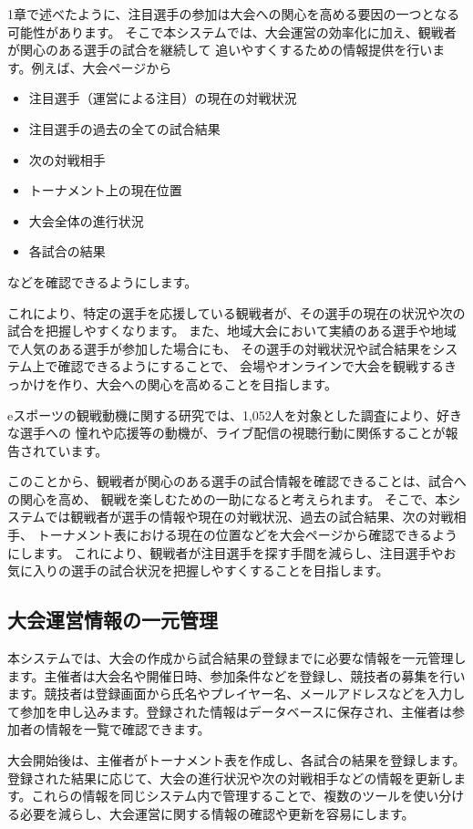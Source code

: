 1章で述べたように、注目選手の参加は大会への関心を高める要因の一つとなる可能性があります。
そこで本システムでは、大会運営の効率化に加え、観戦者が関心のある選手の試合を継続して
追いやすくするための情報提供を行います。例えば、大会ページから

\begin{itemize}
  \item 注目選手（運営による注目）の現在の対戦状況
  \item 注目選手の過去の全ての試合結果
  \item 次の対戦相手
  \item トーナメント上の現在位置
  \item 大会全体の進行状況
  \item 各試合の結果
\end{itemize}
などを確認できるようにします。

これにより、特定の選手を応援している観戦者が、その選手の現在の状況や次の試合を把握しやすくなります。
また、地域大会において実績のある選手や地域で人気のある選手が参加した場合にも、
その選手の対戦状況や試合結果をシステム上で確認できるようにすることで、
会場やオンラインで大会を観戦するきっかけを作り、大会への関心を高めることを目指します。

eスポーツの観戦動機に関する研究では、1,052人を対象とした調査により、好きな選手への
憧れや応援等の動機が、ライブ配信の視聴行動に関係することが報告されています。\cite{scientificreports2024}

このことから、観戦者が関心のある選手の試合情報を確認できることは、試合への関心を高め、
観戦を楽しむための一助になると考えられます。
そこで、本システムでは観戦者が選手の情報や現在の対戦状況、過去の試合結果、次の対戦相手、
トーナメント表における現在の位置などを大会ページから確認できるようにします。
これにより、観戦者が注目選手を探す手間を減らし、注目選手やお気に入りの選手の試合状況を把握しやすくすることを目指します。

\subsection{大会運営情報の一元管理}

本システムでは、大会の作成から試合結果の登録までに必要な情報を一元管理します。主催者は大会名や開催日時、参加条件などを登録し、競技者の募集を行います。競技者は登録画面から氏名やプレイヤー名、メールアドレスなどを入力して参加を申し込みます。登録された情報はデータベースに保存され、主催者は参加者の情報を一覧で確認できます。

大会開始後は、主催者がトーナメント表を作成し、各試合の結果を登録します。登録された結果に応じて、大会の進行状況や次の対戦相手などの情報を更新します。これらの情報を同じシステム内で管理することで、複数のツールを使い分ける必要を減らし、大会運営に関する情報の確認や更新を容易にします。


